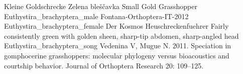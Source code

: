 {Kleine Goldschrecke} %
{Zelena ble\v{s}\v{c}avka} %
{Small Gold Grasshopper} %
{Euthystira_brachyptera_male} %
{Fontana-Orthoptera-IT-2012} %
{Euthystira_brachyptera_female} %
{Der Kosmos Heuschreckenfuehrer} %
{Fairly consistently green with golden sheen, sharp-tip abdomen, sharp-angled head} %
{} %
{Euthystira_brachyptera_song} %
{Vedenina V, Mugue N. 2011. Speciation in gomphocerine
grasshoppers: molecular phylogeny versus bioacoustics and
courtship behavior. Journal of Orthoptera Research 20:
109–125.} %

